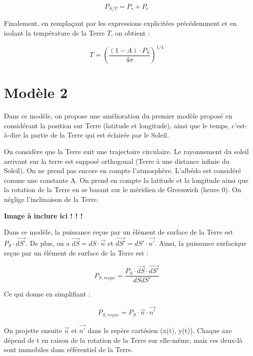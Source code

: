 \documentclass[a4paper,11pt]{article}
\begin{document}
\[ P_{S/T} = P_r + P_e \]

Finalement, en remplaçant par les expressions explicitées précédemment et en isolant la température de la Terre $T$, on obtient :

\[ T = \left(\dfrac{(1 - A) \cdot P_S}{4\sigma}\right)^{1/4} \]

\section{Modèle 2}

Dans ce modèle, on propose une amélioration du premier modèle proposé en considérant la position sur Terre (latitude et longitude), ainsi que le temps, c'est-à-dire la partie de la Terre qui est éclairée par le Soleil.

On considère que la Terre suit une trajectoire circulaire. Le rayonnement du soleil arrivant sur la terre est supposé orthogonal (Terre à une distance infinie du Soleil). On ne prend pas encore en compte l’atmosphère. L’albédo est considéré comme une constante A. On prend en compte la latitude et la longitude ainsi que la rotation de la Terre en se basant sur le méridien de Greenwich (heure 0). On néglige l'inclinaison de la Terre.

\textbf{Image à inclure ici ! ! !
}

Dans ce modèle, la puissance reçue par un élément de surface de la Terre est $P_S \cdot \overrightarrow{dS'}$. De plus, on a $\overrightarrow{dS} = dS \cdot \vec{n}$ et $\overrightarrow{dS'} = dS' \cdot \vec{n'}$. Ainsi, la puissance surfacique reçue par un élément de surface de la Terre est :

\[ P_{S, reçue} = \dfrac{P_S \cdot \overrightarrow{dS} \cdot \overrightarrow{dS'}}{dSdS'} \]

Ce qui donne en simplifiant :

\[ P_{S,reçue} = P_S \cdot \vec{n} \cdot \vec{n'} \]

On projette ensuite $\vec{n}$ et $\vec{n'}$ dans le repère cartésien (x(t), y(t)). Chaque axe dépend de t en raison de la rotation de la Terre sur elle-même, mais ces deux-là sont immobiles dans référentiel de la Terre.
\end{document}
